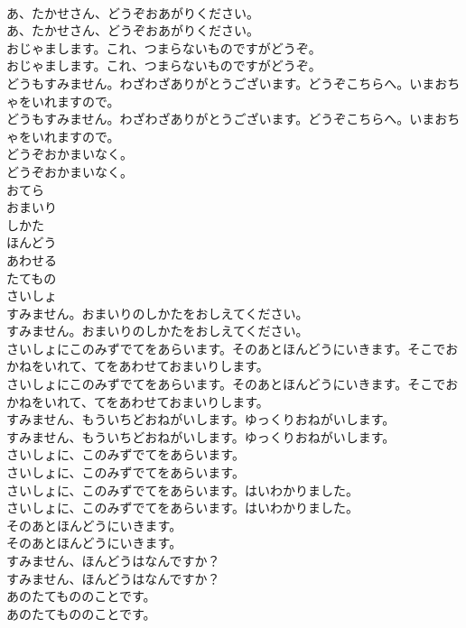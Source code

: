 \documentclass[8pt]{extreport}
\begin{document}
\begin{CJK}{UTF8}{min}
\\	あ、たかせさん、どうぞおあがりください。	
\\	あ、たかせさん、どうぞおあがりください。 
\\	おじゃまします。これ、つまらないものですがどうぞ。	
\\	おじゃまします。これ、つまらないものですがどうぞ。 
\\	どうもすみません。わざわざありがとうございます。どうぞこちらへ。いまおちゃをいれますので。	
\\	どうもすみません。わざわざありがとうございます。どうぞこちらへ。いまおちゃをいれますので。 
\\	どうぞおかまいなく。	
\\	どうぞおかまいなく。 
\\	おてら
\\	おまいり
\\	しかた
\\	ほんどう
\\	あわせる
\\	たてもの
\\	さいしょ
\\	すみません。おまいりのしかたをおしえてください。	
\\	すみません。おまいりのしかたをおしえてください。 
\\	さいしょにこのみずでてをあらいます。そのあとほんどうにいきます。そこでおかねをいれて、てをあわせておまいりします。	
\\	さいしょにこのみずでてをあらいます。そのあとほんどうにいきます。そこでおかねをいれて、てをあわせておまいりします。 
\\	すみません、もういちどおねがいします。ゆっくりおねがいします。	
\\	すみません、もういちどおねがいします。ゆっくりおねがいします。 
\\	さいしょに、このみずでてをあらいます。	
\\	さいしょに、このみずでてをあらいます。 
\\	さいしょに、このみずでてをあらいます。はいわかりました。	
\\	さいしょに、このみずでてをあらいます。はいわかりました。 
\\	そのあとほんどうにいきます。	
\\	そのあとほんどうにいきます。 
\\	すみません、ほんどうはなんですか？	
\\	すみません、ほんどうはなんですか？ 
\\	あのたてもののことです。	
\\	あのたてもののことです。 

\end{CJK}
\end{document}
